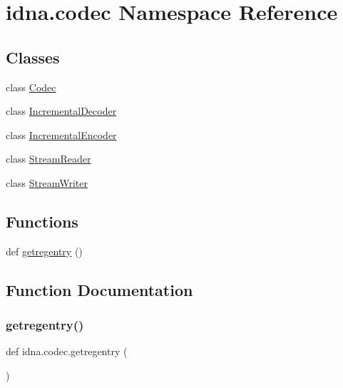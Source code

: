 \hypertarget{namespaceidna_1_1codec}{}\section{idna.\+codec Namespace Reference}
\label{namespaceidna_1_1codec}
\subsection*{Classes}
\begin{DoxyCompactItemize}
\item 
class \hyperlink{classidna_1_1codec_1_1_codec}{Codec}
\item 
class \hyperlink{classidna_1_1codec_1_1_incremental_decoder}{Incremental\+Decoder}
\item 
class \hyperlink{classidna_1_1codec_1_1_incremental_encoder}{Incremental\+Encoder}
\item 
class \hyperlink{classidna_1_1codec_1_1_stream_reader}{Stream\+Reader}
\item 
class \hyperlink{classidna_1_1codec_1_1_stream_writer}{Stream\+Writer}
\end{DoxyCompactItemize}
\subsection*{Functions}
\begin{DoxyCompactItemize}
\item 
def \hyperlink{namespaceidna_1_1codec_a18454cf8bff350d0543a30fcf5805d25}{getregentry} ()
\end{DoxyCompactItemize}


\subsection{Function Documentation}
\mbox{\label{namespaceidna_1_1codec_a18454cf8bff350d0543a30fcf5805d25}} 
\subsubsection{\texorpdfstring{getregentry()}{getregentry()}}
{\footnotesize\ttfamily def idna.\+codec.\+getregentry (\begin{DoxyParamCaption}{ }\end{DoxyParamCaption})}

